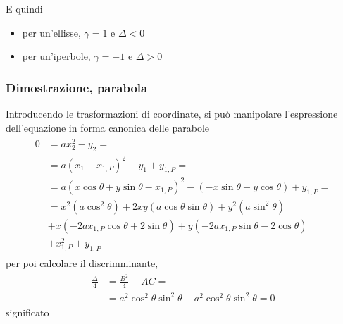 \documentclass[letterpaper,10pt,italian]{jupyterBook}
\begin{document}
\sphinxAtStartPar
E quindi
\begin{itemize}
\item {} 
\sphinxAtStartPar
per un’ellisse, \(\gamma = 1\) e \(\Delta < 0\)

\item {} 
\sphinxAtStartPar
per un’iperbole, \(\gamma =-1\) e \(\Delta > 0\)

\end{itemize}
\subsubsection*{Dimostrazione, parabola}

\sphinxAtStartPar
Introducendo le trasformazioni di coordinate, si può manipolare l’espressione dell’equazione in forma canonica delle parabole
\begin{equation*}
\begin{split}\begin{aligned}
  0
  & = a x_2^2 - y_2 = \\
  & = a ( x_1 - x_{1,P} )^2 - y_1 + y_{1,P} = \\
  & = a ( x \cos \theta + y \sin \theta - x_{1,P} )^2 - ( - x \sin \theta + y \cos \theta ) + y_{1,P} = \\
  & = x^2   \left( a \cos^2 \theta \right)
    + 2 x y \left( a \cos \theta \sin \theta \right) 
    + y^2   \left( a \sin^2 \theta \right) \\
  & + x     \left( - 2 a x_{1,P} \cos \theta + 2 \sin \theta \right) 
    + y     \left( - 2 a x_{1,P} \sin \theta - 2 \cos \theta \right) \\
  & + x_{1,P}^2 + y_{1,P}
\end{aligned}\end{split}
\end{equation*}
\sphinxAtStartPar
per poi calcolare il discrimminante,
\begin{equation*}
\begin{split}\begin{aligned}
  \frac{\Delta}{4}
  & = \frac{B^2}{4} - AC = \\
  & = a^2 \cos^2 \theta \sin^2 \theta - a^2 \cos^2 \theta \sin^2 \theta = 0
\end{aligned}\end{split}
\end{equation*}
\sphinxAtStartPar
{} significato


\subsubsection{}
\label{\detokenize{ch/analytic_geometry/analytic_geometry_2d/conics-general:id1}}
\end{document}
